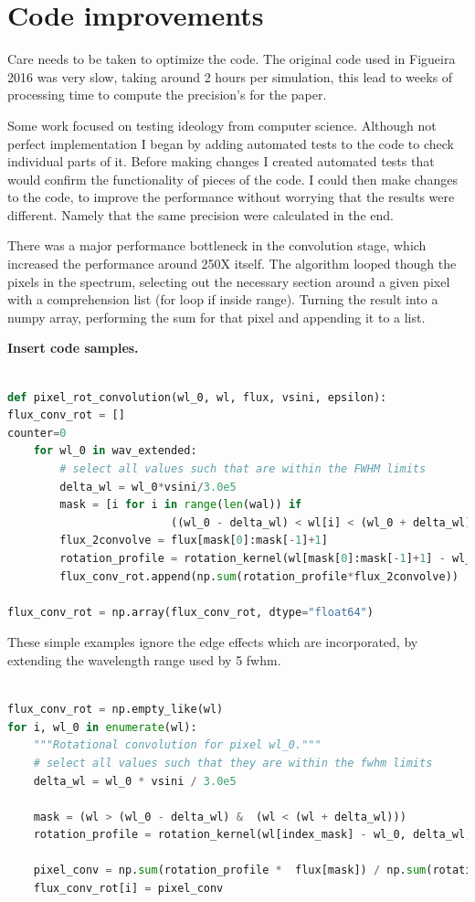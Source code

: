 \section{Code improvements}
Care needs to be taken to optimize the code. The original code used in Figueira 2016 was very slow, taking around 2 hours per simulation, this lead to weeks of processing time to compute the precision's for the paper.

Some work focused on testing ideology from computer science. Although not perfect implementation I began by adding automated tests to the code to check individual parts of it. 
Before making changes I created automated tests that would confirm the functionality of pieces of the code. I could then make changes to the code, to improve the performance without worrying that the results were different.
Namely that the same precision were calculated in the end.

There was a major performance bottleneck in the convolution stage, which increased the performance around 250X itself. The algorithm looped though the pixels in the spectrum, selecting out the necessary section around a given pixel with a comprehension list (for loop if inside range). Turning the result into a numpy array, performing the sum for that pixel and appending it to a list. 

\textbf{Insert code samples.}

\begin{lstlisting}[language=Python, caption=Python example old]

def pixel_rot_convolution(wl_0, wl, flux, vsini, epsilon):
flux_conv_rot = []
counter=0
    for wl_0 in wav_extended:
        # select all values such that are within the FWHM limits
        delta_wl = wl_0*vsini/3.0e5
        mask = [i for i in range(len(wal)) if
                         ((wl_0 - delta_wl) < wl[i] < (wl_0 + delta_wl))]
        flux_2convolve = flux[mask[0]:mask[-1]+1]
        rotation_profile = rotation_kernel(wl[mask[0]:mask[-1]+1] - wl_0, delta_wl, vsini, epsilon)
        flux_conv_rot.append(np.sum(rotation_profile*flux_2convolve))
 
flux_conv_rot = np.array(flux_conv_rot, dtype="float64")

\end{lstlisting}

These simple examples ignore the edge effects which are incorporated, by extending the wavelength range used by 5 fwhm.
\begin{lstlisting}[language=Python, caption=Python example]

flux_conv_rot = np.empty_like(wl)
for i, wl_0 in enumerate(wl):
    """Rotational convolution for pixel wl_0."""
    # select all values such that they are within the fwhm limits
    delta_wl = wl_0 * vsini / 3.0e5

    mask = (wl > (wl_0 - delta_wl) &  (wl < (wl + delta_wl)))
    rotation_profile = rotation_kernel(wl[index_mask] - wl_0, delta_wl, vsini, epsilon)
    
    pixel_conv = np.sum(rotation_profile *  flux[mask]) / np.sum(rotation_profile)
    flux_conv_rot[i] = pixel_conv

\end{lstlisting}


